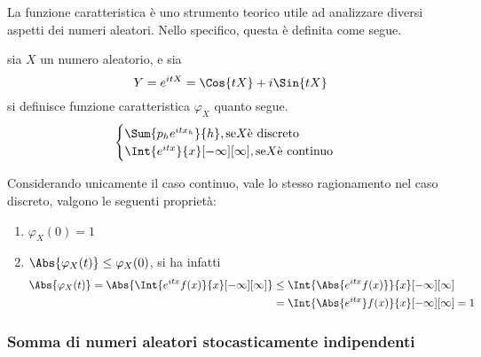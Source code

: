 \documentclass{subfiles}
\begin{document}
La funzione caratteristica è uno strumento teorico utile ad analizzare diversi aspetti dei numeri aleatori.
Nello specifico, questa è definita come segue.
\begin{Definition*}
    sia $X$ un numero aleatorio, e sia
    $$
        Y = e^{itX} = \Cos{tX} + i\Sin{tX}
    $$
    si definisce funzione caratteristica $\varphi_{X}$ quanto segue.
    $$\begin{cases}
            \Sum{p_{h} e^{itx_{h}}}{h}, \text{se} X \text{è discreto} \\
            \Int{e^{itx}}{x}[-\infty][\infty], \text{se} X \text{è continuo}
        \end{cases}$$
\end{Definition*}

Considerando unicamente il caso continuo, vale lo stesso ragionamento nel caso discreto, valgono le seguenti proprietà:
\begin{enumerate}
    \item $\varphi_{X}(0) = 1$
    \item $\Abs{\varphi_{X}(t)} \le \varphi_{X}(0)$, si ha infatti
          $$\begin{aligned}
                  \Abs{\varphi_{X}(t)} = \Abs{\Int{e^{itx} f(x)}{x}[-\infty][\infty]} & \le \Int{\Abs{e^{itx} f(x)}}{x}[-\infty][\infty]   \\
                                                                                      & = \Int{\Abs{e^{itx}} f(x)}{x}[-\infty][\infty] = 1
              \end{aligned}$$
\end{enumerate}

\subsubsection{Somma di numeri aleatori stocasticamente indipendenti}

\end{document}
